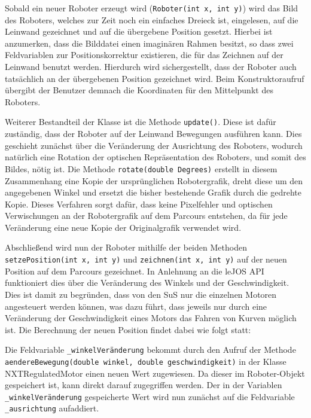 \documentclass[paper=a4, DIV=calc, BCOR=12mm, twoside=on, onecolumn=on, open = right, titlepage =on, parskip =half-, headsepline = on, footsepline = off, chapterprefix = off, appendixprefix = on, fontsize = 12pt, numbers = noenddot, abstract = on]{scrbook}
\begin{document}
Sobald ein neuer Roboter erzeugt wird (\texttt{Roboter(int x, int y)}) wird das Bild des Roboters, welches zur Zeit noch ein einfaches Dreieck ist, eingelesen, auf die Leinwand gezeichnet und auf die übergebene Position gesetzt. Hierbei ist anzumerken, dass die Bilddatei einen imaginären Rahmen besitzt, so dass zwei Feldvariablen zur Positionskorrektur existieren, die für das Zeichnen auf der Leinwand benutzt werden. Hierdurch wird sichergestellt, dass der Roboter auch tatsächlich an der übergebenen Position gezeichnet wird. Beim Konstruktoraufruf übergibt der Benutzer demnach die Koordinaten für den Mittelpunkt des Roboters.

Weiterer Bestandteil der Klasse ist die Methode \texttt{update()}. Diese ist dafür zuständig, dass der Roboter auf der Leinwand Bewegungen ausführen kann. Dies geschieht zunächst über die Veränderung der Ausrichtung des Roboters, wodurch natürlich eine Rotation der optischen Repräsentation des Roboters, und somit des Bildes, nötig ist. Die Methode \texttt{rotate(double Degrees)} erstellt in diesem Zusammenhang eine Kopie der ursprünglichen Robotergrafik, dreht diese um den angegebenen Winkel und ersetzt die bisher bestehende Grafik durch die gedrehte Kopie. Dieses Verfahren sorgt dafür, dass keine Pixelfehler und optischen Verwischungen an der Robotergrafik auf dem Parcours entstehen, da für jede Veränderung eine neue Kopie der Originalgrafik verwendet wird.

Abschließend wird nun der Roboter mithilfe der beiden Methoden \texttt{se\-tzePo\-si\-tion(int x, int y)} und \texttt{zeichnen(int x, int y)} auf der neuen Position auf dem Parcours gezeichnet. In Anlehnung an die leJOS API funktioniert dies über die Veränderung des Winkels und der Geschwindigkeit. Dies ist damit zu begründen, dass von den SuS nur die einzelnen Motoren angesteuert werden können, was dazu führt, dass jeweils nur durch eine Veränderung der Geschwindigkeit eines Motors das Fahren von Kurven möglich ist. Die Berechnung der neuen Position findet dabei wie folgt statt:

Die Feldvariable \texttt{{\_}win\-kel\-Ver\-än\-derung} bekommt durch den Aufruf der Methode \texttt{aen\-de\-re\-Be\-we\-gung(double win\-kel, double ge\-schwin\-dig\-keit)} in der Klasse NXTRegulatedMotor einen neuen Wert zugewiesen. Da dieser im Roboter-Objekt gespeichert ist, kann direkt darauf zugegriffen werden. Der in der Variablen \texttt{{\_}win\-kel\-Ver\-än\-derung} gespeicherte Wert wird nun zunächst auf die Feldvariable \texttt{{\_}ausrichtung} aufaddiert. 
\end{document}
